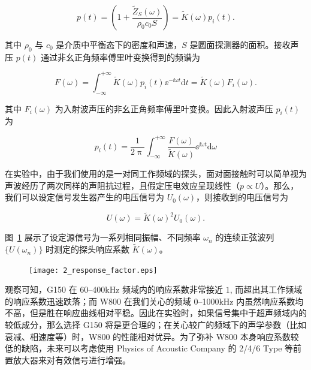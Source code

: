 \begin{equation}
  p(t) = \left(1 + \frac{\widetilde{Z}_{S}(\omega)}{\rho_{0}c_{0}S}\right) =\widetilde{K}(\omega)p_{i}(t).
\end{equation}

其中 $\rho_{0}$ 与 $c_{0}$ 是介质中平衡态下的密度和声速，$S$ 是圆面探测器的面积。接收声压 $p(t)$ 通过非幺正角频率傅里叶变换得到的频谱为

\begin{equation}
  F(\omega) = \int_{-\infty}^{+\infty}\widetilde{K}(\omega)p_{i}(t){\ee}^{-\ii\omega t}\mathrm{d}t = \widetilde{K}(\omega)F_{i}(\omega).
\end{equation}

其中 $F_{i}(\omega)$ 为入射波声压的非幺正角频率傅里叶变换。因此入射波声压 $p_{i}(t)$ 为

\begin{equation}
  p_{i}(t) = \frac{1}{2\uppi}\int_{-\infty}^{+\infty}\frac{F(\omega)}{\widetilde{K}(\omega)}{\ee}^{\ii\omega t}\mathrm{d}\omega\label{eq:response_correct}
\end{equation}

在实验中，由于我们使用的是一对同工作频域的探头，面对面接触时可以简单视为声波经历了两次同样的声阻抗过程，且假定压电效应呈现线性（$p\propto U$）。那么，我们可以设定信号发生器产生的电压信号为 $U_{0}(\omega)$，则接收到的电压信号为

\begin{equation}
  U(\omega) = \widetilde{K}(\omega)^{2}U_{0}(\omega).
\end{equation}

图~\ref{fig:response_factor} 展示了设定源信号为一系列相同振幅、不同频率 $\omega_{n}$ 的连续正弦波列 $\{U(\omega_{n})\}$ 时测定的探头响应系数 $\widetilde{K}(\omega)$。

\begin{figure}[!htp]
  \centering
  \texttt{[image: 2\_response\_factor.eps]}
  \label{fig:response_factor}
\end{figure}

观察可知，G150 在 \numrange{60}{400}\unit{\kilo\hertz} 频域内的响应系数非常接近 $1$, 而超出其工作频域的响应系数迅速跌落；而 W800 在我们关心的频域 \numrange{0}{1000}\unit{\kilo\hertz} 内虽然响应系数均不高，但是胜在响应曲线相对平稳。因此在实验时，如果信号集中于超声频域内的较低成分，那么选择 G150 将是更合理的；在关心较广的频域下的声学参数（比如衰减、相速度等）时，W800 的性能相对优异。为了弥补 W800 本身响应系数较低的缺陷，未来可以考虑使用 Physics of Acoustic Company 的 2/4/6 Type 等前置放大器来对有效信号进行增强。

